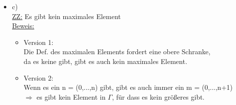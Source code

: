 \documentclass[a4paper]{scrartcl}
\begin{document}
\begin{itemize}
\begin{itemize}
            \end{itemize}

        \item c)\\
            \underline{ZZ:} Es gibt kein maximales Element\\
            \underline{Beweis:}\\
                \begin{itemize}
                    \item Version 1:\\
                        Die Def. des maximalen Elements fordert eine obere Schranke,\\
                        da es keine gibt, gibt es auch kein maximales Element.\\

                    \item Version 2:\\
                        Wenn es ein n = (0,...,n) gibt, gibt es auch immer ein m = (0,...,n+1)\\
                        $\Rightarrow$ es gibt kein Element in $\Gamma$, für dass es kein größeres gibt.\\
                \end{itemize}

    \end{itemize}

\end{document}
